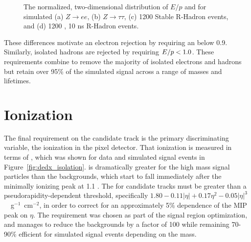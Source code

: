 \begin{figure}[htb]
{}
\caption{The normalized, two-dimensional distribution of $E/p$ and \emfrac for simulated (a) $Z\rightarrow e e$, (b) $Z\rightarrow \tau\tau$, (c) 1200 \GeV Stable R-Hadron events, and (d) 1200 \GeV, 10 ns R-Hadron events.}
\label{fig:eoverp_emfrac}
\end{figure}

These differences motivate an electron rejection by requiring an \emfrac below 0.9.
Similarly, isolated hadrons are rejected by requiring $E/p < 1.0$.
These requirements combine to remove the majority of isolated electrons and hadrons but retain over 95\% of the simulated signal across a range of masses and lifetimes.


\section{Ionization}

The final requirement on the candidate track is the primary discriminating variable, the ionization in the pixel detector.
That ionization is measured in terms of \dedx, which was shown for data and simulated signal events in Figure~\ref{fig:dedx_isolation}.
\dedx is dramatically greater for the high mass signal particles than the backgrounds, which start to fall immediately after the minimally ionizing peak at 1.1 \MeVgcm. 
The \dedx for candidate tracks must be greater than a pseudorapidity-dependent threshold, specifically $1.80 - 0.11 |\eta| + 0.17 \eta^2 - 0.05 |\eta|^3 $~\MeV~g$^{-1}$~cm$^{-2}$, in order to correct for an approximately 5\% dependence of the \ac{MIP} peak on $\eta$. 
The requirement was chosen as part of the signal region optimization, and manages to reduce the backgrounds by a factor of 100 while remaining 70-90\% efficient for simulated signal events depending on the mass.

